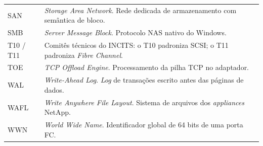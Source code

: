 \documentclass[11pt,a4paper]{article}
\begin{document}
{\begin{longtable}{@{}p{2.2cm}p{13.4cm}@{}}
SAN & \textit{Storage Area Network}. Rede dedicada de armazenamento com semântica de bloco. \\
SMB & \textit{Server Message Block}. Protocolo NAS nativo do Windows. \\
T10 / T11 & Comitês técnicos do INCITS: o T10 padroniza SCSI; o T11 padroniza \textit{Fibre Channel}. \\
TOE & \textit{TCP Offload Engine}. Processamento da pilha TCP no adaptador. \\
WAL & \textit{Write-Ahead Log}. \textit{Log} de transações escrito antes das páginas de dados. \\
WAFL & \textit{Write Anywhere File Layout}. Sistema de arquivos dos \textit{appliances} NetApp. \\
WWN & \textit{World Wide Name}. Identificador global de 64 bits de uma porta FC. \\
\end{longtable}}
\end{document}
